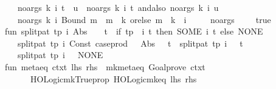 \begin{isabellebody}
\ \ \ \ {\isacharbar}{\kern0pt}\ no{\isacharunderscore}{\kern0pt}args\ k\ i\ {\isacharparenleft}{\kern0pt}t\ {\isachardollar}{\kern0pt}\ u{\isacharparenright}{\kern0pt}\ {\isacharequal}{\kern0pt}\ no{\isacharunderscore}{\kern0pt}args\ k\ i\ t\ andalso\ no{\isacharunderscore}{\kern0pt}args\ k\ i\ u\isanewline
\ \ \ \ {\isacharbar}{\kern0pt}\ no{\isacharunderscore}{\kern0pt}args\ k\ i\ {\isacharparenleft}{\kern0pt}Bound\ m{\isacharparenright}{\kern0pt}\ {\isacharequal}{\kern0pt}\ m\ {\isacharless}{\kern0pt}\ k\ orelse\ m\ {\isachargreater}{\kern0pt}\ k\ {\isacharplus}{\kern0pt}\ i\isanewline
\ \ \ \ {\isacharbar}{\kern0pt}\ no{\isacharunderscore}{\kern0pt}args\ {\isacharunderscore}{\kern0pt}\ {\isacharunderscore}{\kern0pt}\ {\isacharunderscore}{\kern0pt}\ {\isacharequal}{\kern0pt}\ true{\isacharsemicolon}{\kern0pt}\isanewline
\ \ fun\ split{\isacharunderscore}{\kern0pt}pat\ tp\ i\ {\isacharparenleft}{\kern0pt}Abs\ \ {\isacharparenleft}{\kern0pt}{\isacharunderscore}{\kern0pt}{\isacharcomma}{\kern0pt}\ {\isacharunderscore}{\kern0pt}{\isacharcomma}{\kern0pt}\ t{\isacharparenright}{\kern0pt}{\isacharparenright}{\kern0pt}\ {\isacharequal}{\kern0pt}\ if\ tp\ {}\ i\ t\ then\ SOME\ {\isacharparenleft}{\kern0pt}i{\isacharcomma}{\kern0pt}\ t{\isacharparenright}{\kern0pt}\ else\ NONE\isanewline
\ \ \ \ {\isacharbar}{\kern0pt}\ split{\isacharunderscore}{\kern0pt}pat\ tp\ i\ {\isacharparenleft}{\kern0pt}Const\ {\isacharparenleft}{\kern0pt}\isactrlconstUNDERSCOREname {\isasymopen}case{\isacharunderscore}{\kern0pt}prod{\isasymclose}{\isacharcomma}{\kern0pt}\ {\isacharunderscore}{\kern0pt}{\isacharparenright}{\kern0pt}\ {\isachardollar}{\kern0pt}\ Abs\ {\isacharparenleft}{\kern0pt}{\isacharunderscore}{\kern0pt}{\isacharcomma}{\kern0pt}\ {\isacharunderscore}{\kern0pt}{\isacharcomma}{\kern0pt}\ t{\isacharparenright}{\kern0pt}{\isacharparenright}{\kern0pt}\ {\isacharequal}{\kern0pt}\ split{\isacharunderscore}{\kern0pt}pat\ tp\ {\isacharparenleft}{\kern0pt}i\ {\isacharplus}{\kern0pt}\ {}{\isacharparenright}{\kern0pt}\ t\isanewline
\ \ \ \ {\isacharbar}{\kern0pt}\ split{\isacharunderscore}{\kern0pt}pat\ tp\ i\ {\isacharunderscore}{\kern0pt}\ {\isacharequal}{\kern0pt}\ NONE{\isacharsemicolon}{\kern0pt}\isanewline
\ \ fun\ metaeq\ ctxt\ lhs\ rhs\ {\isacharequal}{\kern0pt}\ mk{\isacharunderscore}{\kern0pt}meta{\isacharunderscore}{\kern0pt}eq\ {\isacharparenleft}{\kern0pt}Goal{\isachardot}{\kern0pt}prove\ ctxt\ {\isacharbrackleft}{\kern0pt}{\isacharbrackright}{\kern0pt}\ {\isacharbrackleft}{\kern0pt}{\isacharbrackright}{\kern0pt}\isanewline
\ \ \ \ \ \ \ \ {\isacharparenleft}{\kern0pt}HOLogic{\isachardot}{\kern0pt}mk{\isacharunderscore}{\kern0pt}Trueprop\ {\isacharparenleft}{\kern0pt}HOLogic{\isachardot}{\kern0pt}mk{\isacharunderscore}{\kern0pt}eq\ {\isacharparenleft}{\kern0pt}lhs{\isacharcomma}{\kern0pt}\ rhs{\isacharparenright}{\kern0pt}{\isacharparenright}{\kern0pt}{\isacharparenright}{\kern0pt}\isanewline

\end{isabellebody}

